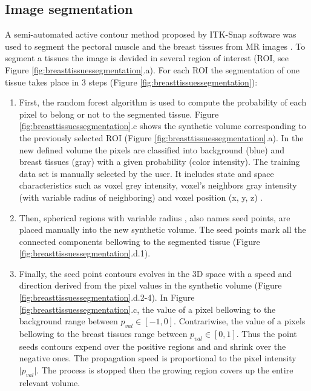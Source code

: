 \subsection{Image segmentation}%

A semi-automated active contour method proposed by ITK-Snap software was used to segment the pectoral muscle and the breast tissues from MR images \citep{yushkevich_user_2006}. To segment a tissues the image is devided in several region of interest (ROI, see Figure \ref{fig:breasttissuessegmentation}.a). For each ROI the segmentation of one tissue takes place in 3 steps (Figure \ref{fig:breasttissuessegmentation}):
\begin{enumerate}
\item First, the random forest algorithm \citep{ho_random_1995} is used to compute the probability of each pixel to belong or not to the segmented tissue. Figure \ref{fig:breasttissuessegmentation}.c shows the synthetic volume corresponding to the previously selected ROI (Figure \ref{fig:breasttissuessegmentation}.a). In the new defined volume the pixels are classified into background (blue) and breast tissues (gray) with a given probability (color intensity). The training data set is manually selected by the user. It includes state and space characteristics such as voxel grey intensity, voxel's neighbors gray intensity (with variable radius of neighboring) and voxel position (x, y, z) . 

\item Then, spherical regions with variable radius , also names seed points, are placed manually into the new synthetic volume. The seed points mark all the connected components bellowing to the segmented tissue (Figure \ref{fig:breasttissuessegmentation}.d.1).

\item Finally, the seed point contours evolves in the 3D space with a speed and direction derived from the pixel values in the synthetic volume (Figure \ref{fig:breasttissuessegmentation}.d.2-4). In Figure \ref{fig:breasttissuessegmentation}.c, the value of a pixel bellowing to the background range between $p_{val} \in [-1,0]$. Contrariwise, the value of a pixels bellowing to the breast tissues range between $p_{val} \in [0,1]$. Thus the point seeds contours expend over the positive regions and and shrink over the negative ones. The propagation speed is proportional to the pixel intensity $\vert p_{val} \vert$. The process is stopped then the growing region covers up the entire relevant volume.  
\end{enumerate}

